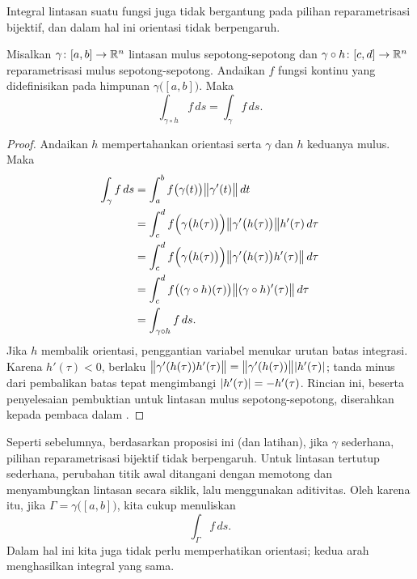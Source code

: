 Integral lintasan suatu fungsi juga tidak bergantung pada pilihan reparametrisasi
bijektif, dan dalam hal ini orientasi tidak berpengaruh.

\begin{prop} \label{mv:prop:lineintrepararam}
Misalkan $\gamma \colon [a,b] \to {\mathbb{R}}^n$ lintasan mulus sepotong-sepotong dan
$\gamma \circ h \colon [c,d] \to {\mathbb{R}}^n$ reparametrisasi mulus sepotong-sepotong.
Andaikan $f$ fungsi kontinu yang didefinisikan pada himpunan
$\gamma\bigl([a,b]\bigr)$.  Maka
\begin{equation*}
\int_{\gamma \circ h} f\, ds = \int_{\gamma} f\, ds .
\end{equation*}
\end{prop}

\begin{proof}
Andaikan $h$ mempertahankan orientasi serta $\gamma$ dan $h$
keduanya mulus.  Maka 
\begin{equation*}
\begin{split}
\int_{\gamma} f \, ds
& =
\int_a^b 
f\bigl(\gamma(t)\bigr) \bigl\lVert {\gamma'(t)} \bigr\rVert \, dt
\\
& =
\int_c^d 
f\Bigl(\gamma\bigl(h(\tau)\bigr)\Bigr)
\bigl\lVert {\gamma'\bigl(h(\tau)\bigr)} \bigr\rVert h'(\tau) \, d\tau
\\
& =
\int_c^d 
f\Bigl(\gamma\bigl(h(\tau)\bigr)\Bigr)
\bigl\lVert {\gamma'\bigl(h(\tau)\bigr) h'(\tau)} \bigr\rVert \, d\tau
\\
& =
\int_c^d 
f\bigl((\gamma \circ h)(\tau)\bigr) \bigl\lVert {(\gamma \circ h)'(\tau)} \bigr\rVert \, d\tau
\\
& = 
\int_{\gamma \circ h} f \, ds .
\end{split}
\end{equation*}
Jika $h$ membalik orientasi, penggantian variabel menukar urutan batas
integrasi.  Karena $h'(\tau)<0$, berlaku
$\bigl\lVert {\gamma'(h(\tau))h'(\tau)} \bigr\rVert=\bigl\lVert {\gamma'(h(\tau))} \bigr\rVert\lvert {h'(\tau)} \rvert$;
tanda minus dari pembalikan batas tepat mengimbangi
$\lvert {h'(\tau)} \rvert=-h'(\tau)$.
Rincian ini, beserta penyelesaian pembuktian untuk lintasan mulus
sepotong-sepotong, diserahkan kepada pembaca dalam .
\end{proof}

Seperti sebelumnya, berdasarkan proposisi ini (dan latihan),
jika $\gamma$ sederhana, pilihan reparametrisasi bijektif tidak berpengaruh.
Untuk lintasan tertutup sederhana, perubahan titik awal ditangani dengan memotong
dan menyambungkan lintasan secara siklik, lalu menggunakan aditivitas.
Oleh karena itu, jika $\Gamma = \gamma\bigl( [a,b] \bigr)$, kita cukup
menuliskan
\begin{equation*}
\int_\Gamma f\, ds .
\end{equation*}
Dalam hal ini kita juga tidak perlu memperhatikan orientasi; kedua arah
menghasilkan integral yang sama.

